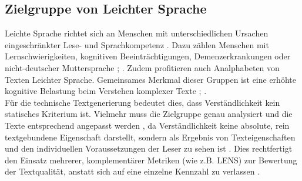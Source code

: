 \subsection{Zielgruppe von Leichter Sprache}
Leichte Sprache richtet sich an Menschen mit unterschiedlichen Ursachen eingeschränkter Lese- und Sprachkompetenz \cite[S. 19-20]{maas_leichte_2015}.
Dazu zählen Menschen mit Lernschwierigkeiten, kognitiven Beeinträchtigungen, Demenzerkrankungen oder nicht-deutscher Muttersprache \cite[S. 38]{maas_handbuch_2018}; \cite[S. 16-18]{maas_leichte_2015}.
Zudem profitieren auch Analphabeten von Texten Leichter Sprache.
Gemeinsames Merkmal dieser Gruppen ist eine erhöhte kognitive Belastung beim Verstehen komplexer Texte \cite[S. 15-18]{maas_leichte_2015}; \cite[S. 31, 38-45]{maas_handbuch_2018}.\\
Für die technische Textgenerierung bedeutet dies, dass Verständlichkeit kein statisches Kriterium ist. Vielmehr muss die Zielgruppe genau analysiert und die Texte entsprechend angepasst werden \cite[S. 290, 293]{maas_handbuch_2018}, da Verständlichkeit keine absolute, rein textgebundene Eigenschaft darstellt, sondern als Ergebnis von Texteigenschaften und den individuellen Voraussetzungen der Leser zu sehen ist \cite[S. 32-33]{maas_handbuch_2018}.
Dies rechtfertigt den Einsatz mehrerer, komplementärer Metriken (wie z.B. LENS) zur Bewertung der Textqualität, anstatt sich auf eine einzelne Kennzahl zu verlassen \cite[Abschnitt 1, 4.2]{maddela_lens_2023}.

